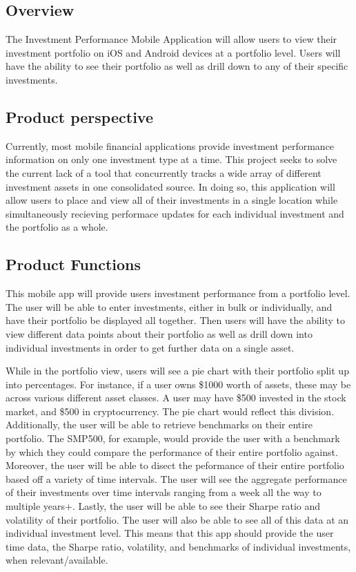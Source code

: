 \documentclass[onecolumn, draftclsnofoot,10pt, compsoc]{IEEEtran}
\begin{document}
\subsection{Overview}

The Investment Performance Mobile Application will allow users to view their investment portfolio on iOS and Android devices
at a portfolio level. Users will have the ability to see their portfolio as well as drill down to any of their specific investments.


\subsection{Product perspective}

Currently, most mobile financial applications provide investment performance information on only one investment type at a time. 
This project seeks to solve the current lack of a tool that concurrently tracks a wide array of different investment assets in 
one consolidated source. In doing so, this application will allow users to place and view all of their investments in a single location 
while simultaneously recieving performace updates for each individual investment and the portfolio as a whole.

\subsection{Product Functions}
This mobile app will provide users investment performance from a portfolio level. The user will be able to enter investments, either 
in bulk or individually, and have their portfolio be displayed all together. Then users will have the ability to view different data
points about their portfolio as well as drill down into individual investments in order to get further data on a single asset.

While in the portfolio view, users will see a pie chart with their portfolio split up into percentages. 
For instance, if a user owns \$1000 worth of assets, these may be across various different asset classes. A user may have \$500 invested in the stock market, 
and \$500 in cryptocurrency. The pie chart would reflect this division. Additionally, the user will be able to retrieve benchmarks on their entire portfolio. 
The SMP500, for example, would provide the user with a benchmark by which they could compare the performance of their entire portfolio against. 
Moreover, the user will be able to disect the peformance of their entire portfolio based off a variety of time intervals. The user will see the aggregate 
performance of their investments over time intervals ranging from a week all the way to multiple years+. Lastly, the user will be able to see their Sharpe ratio and volatility of their portfolio. 
The user will also be able to see all of this data at an individual investment level. This means that this app should provide the user 
time data, the Sharpe ratio, volatility, and benchmarks of individual investments, when relevant/available.
\end{document}
